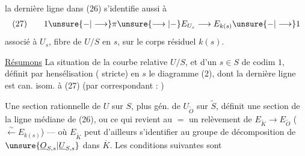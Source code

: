 la dernière ligne dans (26) s'identifie aussi à
\[
(27)\qquad 1\unsure{-|\longrightarrow}\pi\unsure{\longrightarrow|-}E_{U_s}\longrightarrow E_{k(s)}\unsure{-|\longrightarrow}1
\]
associé à $U_s$, fibre de $U/S$ en $s$, sur le corps résiduel $k(s)$.

\uline{Résumons} La situation de la courbe relative $U/S$, et d'un $s\in S$ de codim $1$, définit par hensélisation ( stricte) en $s$ le diagramme (2), dont la dernière ligne est can. isom. à (27) (par   correspondant :
)

Une section rationnelle  de $U$ sur $S$, plus gén.  de $U_{\widetilde O}$ sur $\widetilde S$, définit une section  de la ligne médiane de (26), ou ce qui revient au $=$ un relèvement
de $E_{\widetilde K}\longrightarrow E_{\widetilde O}$ ($\xleftarrow{\sim}E_{k(s)}$) --- où $E_{\widetilde K}$ peut d'ailleurs s'identifier au groupe de décomposition de $\unsure{\underline O_{S,s}|\underline U_{S,s}}$ dans $\overline K$. Les conditions suivantes sont
